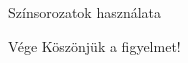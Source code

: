 \documentclass[aspectratio=1610, dvipsnames, xcolor=table]{beamer}
\begin{document}
\begin{frame}[fragile]{Színsorozatok használata}
\begin{figure}[b]
\begin{subfigure}[!b]{0.2\textwidth}
            \end{subfigure}
        \end{figure}
    \end{frame}

    \begin{frame}{Vége}
        \centering \Huge Köszönjük a figyelmet!
    \end{frame}
\end{document}
